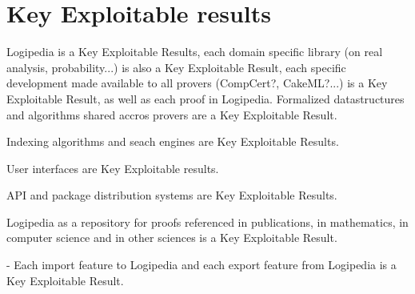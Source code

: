 \section{Key Exploitable results}

Logipedia is a Key Exploitable Results, each domain specific library
(on real analysis, probability...) is also a Key Exploitable Result,
each specific development made available to all provers (CompCert?,
CakeML?...) is a Key Exploitable Result, as well as each proof in
Logipedia. Formalized datastructures and algorithms shared accros
provers are a Key Exploitable Result.

Indexing algorithms and seach engines are Key Exploitable Results.

User interfaces are Key Exploitable results.

API and package distribution systems are Key Exploitable Results.

Logipedia as a repository for proofs referenced in publications, 
in mathematics, in computer science and in other sciences is a
Key Exploitable Result.

- Each import feature to Logipedia and each export
feature from  Logipedia is a 
Key Exploitable Result.

